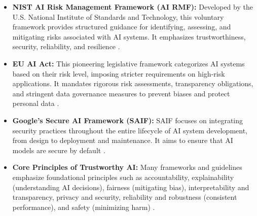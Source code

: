 \begin{itemize}
    \item \textbf{NIST AI Risk Management Framework (AI RMF):} Developed by the U.S. National Institute of Standards and Technology, this voluntary framework provides structured guidance for identifying, assessing, and mitigating risks associated with AI systems. It emphasizes trustworthiness, security, reliability, and resilience \parencite{NIST2023AIRMF}.
    \item \textbf{EU AI Act:} This pioneering legislative framework categorizes AI systems based on their risk level, imposing stricter requirements on high-risk applications. It mandates rigorous risk assessments, transparency obligations, and stringent data governance measures to prevent biases and protect personal data \parencite{EU_AI_Act_2024}.
    \item \textbf{Google's Secure AI Framework (SAIF):} SAIF focuses on integrating security practices throughout the entire lifecycle of AI system development, from design to deployment and maintenance. It aims to ensure that AI models are secure by default \parencite{SafetyGoogle2023}.
    \item \textbf{Core Principles of Trustworthy AI:} Many frameworks and guidelines emphasize foundational principles such as accountability, explainability (understanding AI decisions), fairness (mitigating bias), interpretability and transparency, privacy and security, reliability and robustness (consistent performance), and safety (minimizing harm) \parencite{MaximAI2025}.
\end{itemize}

